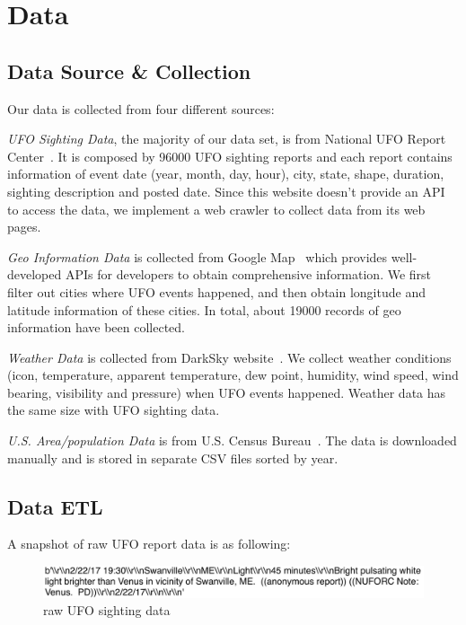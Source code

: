\section{Data}\label{data}
\subsection{Data Source \& Collection}
Our data is collected from four different sources:

\emph{UFO Sighting Data}, the majority of our data set, is from National UFO Report Center~\cite{nuforc}. It is composed by 96000 UFO sighting reports and each report contains information of event date (year, month, day, hour), city, state, shape, duration, sighting description and posted date. Since this website doesn't provide an API to access the data, we implement a web crawler to collect data from its web pages. 

\emph{Geo Information Data} is collected from Google Map~\cite{googlemap} which provides well-developed APIs for developers to obtain comprehensive information. We first filter out cities where UFO events happened, and then obtain longitude and latitude information of these cities. In total, about 19000 records of geo information have been collected. 

\emph{Weather Data} is collected from DarkSky website~\cite{darksky}. We collect weather conditions (icon, temperature, apparent temperature, dew point, humidity, wind speed, wind bearing, visibility and pressure) when UFO events happened. Weather data has the same size with UFO sighting data.

\emph{U.S. Area/population Data} is from U.S. Census Bureau~\cite{census}. The data is downloaded manually and is stored in separate CSV files sorted by year.

\subsection{Data ETL}
A snapshot of raw UFO report data is as following:

\begin{figure}[H]
    \centering
    \includegraphics[width=14cm]{figure/raw_event.jpg}
    \caption{raw UFO sighting data}
    \label{raw_event}
\end{figure}

